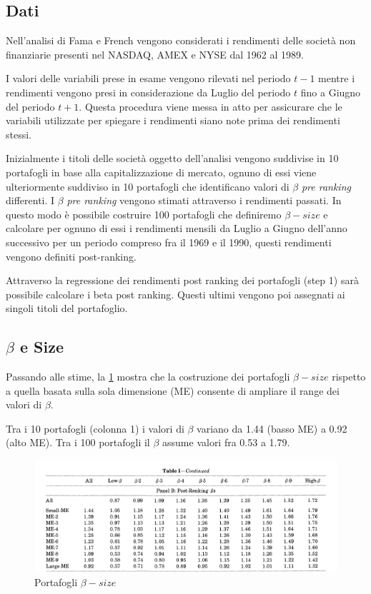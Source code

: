 \subsection{Dati}
Nell'analisi di Fama e French vengono considerati i rendimenti delle società non finanziarie presenti nel NASDAQ, AMEX e NYSE dal 1962 al 1989. 

I valori delle variabili prese in esame vengono rilevati nel periodo $t-1$ mentre i rendimenti vengono presi in considerazione da Luglio del periodo $t$ fino a Giugno del periodo $t+1$. Questa procedura viene messa in atto per assicurare che le variabili utilizzate per spiegare i rendimenti siano note prima dei rendimenti stessi. 

Inizialmente i titoli delle società oggetto dell'analisi vengono suddivise in 10 portafogli in base alla capitalizzazione di mercato, ognuno di essi viene ulteriormente suddiviso in  10 portafogli che identificano valori di $\beta$ \textit{pre ranking} differenti. I $\beta$ \textit{pre ranking} vengono stimati attraverso i rendimenti passati. In questo modo è possibile costruire 100 portafogli che definiremo $\beta-size$ e calcolare per ognuno di essi i rendimenti mensili da Luglio a Giugno dell'anno successivo per un periodo compreso fra il 1969 e il 1990, questi rendimenti vengono definiti post-ranking.

Attraverso la regressione dei rendimenti post ranking dei portafogli (step 1) sarà possibile calcolare i beta post ranking. Questi ultimi vengono poi assegnati ai singoli titoli del portafoglio.

\subsection{$\beta$ e Size}

Passando alle stime, la \ref{fig:table-i-boh} mostra che la costruzione dei portafogli $\beta-size$ rispetto a quella basata sulla sola dimensione (ME) consente di ampliare il range dei valori di $\beta$. 

Tra i 10 portafogli (colonna 1) i valori di  $\beta$ variano da 1.44 (basso ME) a 0.92 (alto ME). Tra i 100 portafogli il $\beta$ assume valori fra 0.53 a 1.79.


\begin{figure}[h]
	\centering
	\includegraphics[width=0.9\linewidth]{"imgs/table I boh"}
	\caption{Portafogli $\beta-size$}
	\label{fig:table-i-boh}
\end{figure}
	

